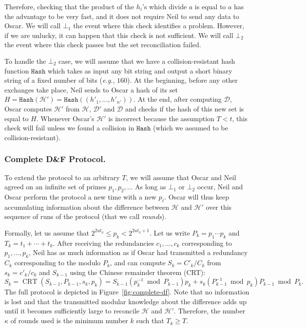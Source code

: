 \documentclass{llncs}
\newcommand{\Set}{\mathcal{H}}
\newcommand{\SetD}{\mathcal{D}}
\newcommand{\df}{D\&F\xspace}
\newcommand{\eg}{\textit{e.g.}\xspace}
\newcommand{\Hash}{\ensuremath{\mathtt{Hash}}}
\DeclareMathOperator{\CRT}{CRT}
\begin{document}
Therefore, checking that the product of the $h_i$'s which divide $a$ is equal to $a$ has the advantage to be very fast, and it does not require Neil to send any data to Oscar. We will call $\bot_1$ the event where this check identifies a problem. 
However, if we are unlucky, it can happen that this check is not sufficient. We will call $\bot_2$ the event where this check passes but the set reconciliation failed.

To handle the $\bot_2$ case, we will assume that we have a collision-resistant hash function $\Hash$ which takes as input any bit string and output a short binary string of a fixed number of bits (\eg, $160$).
At the beginning, before any other exchanges take place, Neil sends to Oscar a hash of its set $H = \Hash(\Set') = \Hash((h'_1,\dots,h'_{n'}))$. At the end, after computing $\SetD$, Oscar computes $\Set'$ from $\Set$, $\SetD'$ and $\SetD$ and checks if the hash of this new set is equal to $H$.
Whenever Oscar's $\Set'$ is incorrect because the assumption $T < t$, this check will fail unless we found a collision in $\Hash$ (which we assumed to be collision-resistant).

\subsubsection{Complete \df Protocol.}
\label{sec:complete-df}

To extend the protocol to an arbitrary $T$, we will assume that Oscar and Neil agreed on an infinite set of primes $p_1,p_2,\ldots$ As long as $\bot_1$ or $\bot_2$ occur, Neil and Oscar perform the protocol a new time with a new $p_\ell$. Oscar will thus keep accumulating information about the difference between $\Set$ and $\Set'$ over this sequence of runs of the protocol (that we call \emph{rounds}).

Formally, let us assume that $2^{2 u t_k} \le p_k < 2^{2 u t_k +1}$.
Let us write $P_k = p_1 \cdots p_k$ and $T_k = t_1 + \cdots + t_k$.
After receiving the redundancies $c_1,\dots,c_k$ corresponding to $p_1,\dots,p_k$, Neil has as much information as if Oscar had transmitted a redundancy $C_k$ corresponding to the modulo $P_k$, and can compute $S_k = C'_k / C_k$ from $s_k = c'_k/c_k$ and $S_{k-1}$ using the Chinese remainder theorem (CRT): 
\[ S_k = \CRT(S_{k-1},P_{k-1},s_k,p_k) = S_{k-1} (p_k^{-1} \bmod P_{k-1}) p_k + s_k (P_{k-1}^{-1} \bmod p_k) P_{k-1} \bmod P_k. \]
The full protocol is depicted in Figure~\ref{fig:complete-df}.
Note that no information is lost and that the transmitted modular knowledge about the difference adds up until it becomes sufficiently large to reconcile $\Set$ and $\Set'$.
Therefore, the number $\kappa$ of rounds used is the minimum number $k$ such that $T_k \ge T$.
\end{document}

